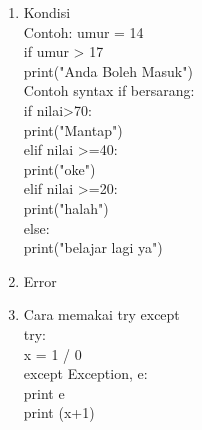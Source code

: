 \begin{enumerate}
\begin{enumerate}[label=\alph*.]
\item Kondisi\\
Contoh: 
umur = 14\\
if umur > 17\\
	print("Anda Boleh Masuk")\\

Contoh syntax if bersarang:\\
if nilai>70:\\
	print("Mantap")\\
elif nilai >=40:\\
	print("oke")\\
elif nilai >=20:\\
	print("halah")\\
else:\\
	print("belajar lagi ya")\\

\item Error

\item Cara memakai try except\\
try:\\
	x = 1 / 0\\
except Exception, e:\\
	print e\\

print (x+1)
\end{enumerate}

\end{enumerate}